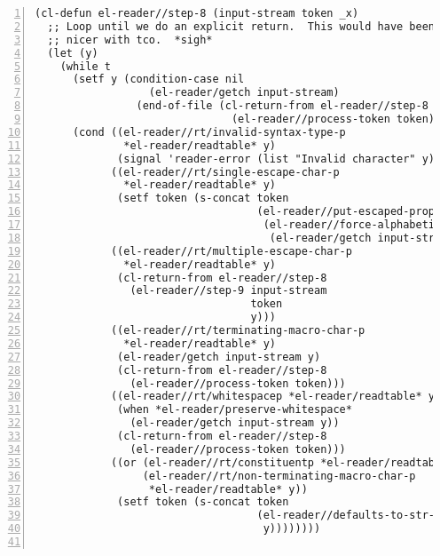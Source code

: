 \documentclass[a4paper,10pt,twoside]{report}
\begin{document}
\begin{lstlisting}[style=lispcode,label={code:read-algo},caption={Code for the
    reader algorithm.},numbers=left]
(cl-defun el-reader//step-8 (input-stream token _x)
  ;; Loop until we do an explicit return.  This would have been so much
  ;; nicer with tco.  *sigh*
  (let (y)
    (while t
      (setf y (condition-case nil
                  (el-reader/getch input-stream)
                (end-of-file (cl-return-from el-reader//step-8
                               (el-reader//process-token token)))))
      (cond ((el-reader//rt/invalid-syntax-type-p
              *el-reader/readtable* y)
             (signal 'reader-error (list "Invalid character" y)))
            ((el-reader//rt/single-escape-char-p
              *el-reader/readtable* y)
             (setf token (s-concat token
                                   (el-reader//put-escaped-prop
                                    (el-reader//force-alphabetic
                                     (el-reader/getch input-stream))))))
            ((el-reader//rt/multiple-escape-char-p
              *el-reader/readtable* y)
             (cl-return-from el-reader//step-8
               (el-reader//step-9 input-stream
                                  token
                                  y)))
            ((el-reader//rt/terminating-macro-char-p
              *el-reader/readtable* y)
             (el-reader/getch input-stream y)
             (cl-return-from el-reader//step-8
               (el-reader//process-token token)))
            ((el-reader//rt/whitespacep *el-reader/readtable* y)
             (when *el-reader/preserve-whitespace*
               (el-reader/getch input-stream y))
             (cl-return-from el-reader//step-8
               (el-reader//process-token token)))
            ((or (el-reader//rt/constituentp *el-reader/readtable* y)
                 (el-reader//rt/non-terminating-macro-char-p
                  *el-reader/readtable* y))
             (setf token (s-concat token
                                   (el-reader//defaults-to-str-props
                                    y))))))))


\end{lstlisting}
\end{document}
